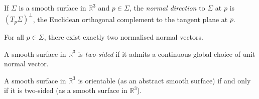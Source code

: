 \begin{definition}
	If \( \Sigma \) is a smooth surface in \( \mathbb R^3 \) and \( p \in \Sigma \), the \textit{normal direction} to \( \Sigma \) at \( p \) is \( (T_p \Sigma)^\perp \), the Euclidean orthogonal complement to the tangent plane at \( p \).
\end{definition}
\begin{remark}
	For all \( p \in \Sigma \), there exist exactly two normalised normal vectors.
\end{remark}
\begin{definition}
	A smooth surface in \( \mathbb R^3 \) is \textit{two-sided} if it admits a continuous global choice of unit normal vector.
\end{definition}
\begin{lemma}
	A smooth surface in \( \mathbb R^3 \) is orientable (as an abstract smooth surface) if and only if it is two-sided (as a smooth surface in \( \mathbb R^3 \)).
\end{lemma}

